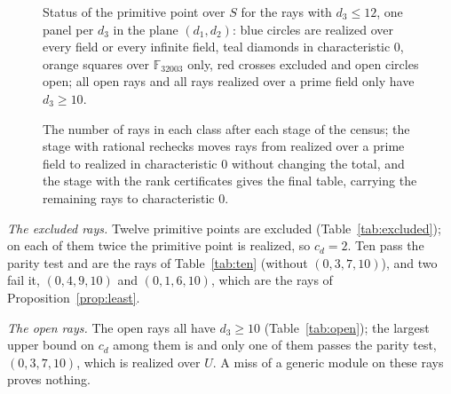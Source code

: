 \documentclass[11pt]{article}
\theoremstyle{definition}
\theoremstyle{remark}
\newcommand{\F}{\mathbb{F}}
\begin{document}
\begin{figure}[htbp]
\centering

\caption{Status of the primitive point over $S$ for the \nrays{} rays with $d_3\le12$, one panel per $d_3$ in the plane $(d_1,d_2)$: blue circles are realized over every field or every infinite field, teal diamonds in characteristic $0$, orange squares over $\F_{32003}$ only, red crosses excluded and open circles open; all open rays and all rays realized over a prime field only have $d_3\ge10$.}
\label{fig:lattice-s}
\end{figure}

\begin{figure}[htbp]
\centering

\caption{The number of rays in each class after each stage of the census; the stage with rational rechecks moves rays from realized over a prime field to realized in characteristic $0$ without changing the total, and the stage with the rank certificates gives the final table, carrying the remaining rays to characteristic $0$.}
\label{fig:stages}
\end{figure}

\emph{The excluded rays.} Twelve primitive points are excluded (Table~\ref{tab:excluded}); on each of them twice the primitive point is realized, so $c_d=2$. Ten pass the parity test and are the rays of Table~\ref{tab:ten} (without $(0,3,7,10)$), and two fail it, $(0,4,9,10)$ and $(0,1,6,10)$, which are the rays of Proposition~\ref{prop:least}.

\begin{table}[htbp]
\centering\footnotesize

\caption{The \nexcluded{} rays with $d_3\le12$ whose primitive point is excluded over $S$: the primitive point, the parity value, the obstructions O1 to O6 that exclude it (with those of the dual ray), the least realizable multiple $c_d=2$ and the module over $U$ where the parity value is zero.}
\label{tab:excluded}
\end{table}

\emph{The open rays.} The \nopen{} open rays all have $d_3\ge10$ (Table~\ref{tab:open}); the largest upper bound on $c_d$ among them is \nopenMaxUp{} and only one of them passes the parity test, $(0,3,7,10)$, which is realized over $U$. A miss of a generic module on these rays proves nothing.

\begin{table}[htbp]
\centering\footnotesize

\caption{The \nopen{} rays whose primitive point is open over $S$: the primitive point, the parity value, the bounds on the least multiple $c_d$ (the lower bound from the obstructions, the upper bound from the constructions) and the dual ray; the search over $\F_{32003}$ found no hit on any of them.}
\label{tab:open}
\end{table}
\end{document}
